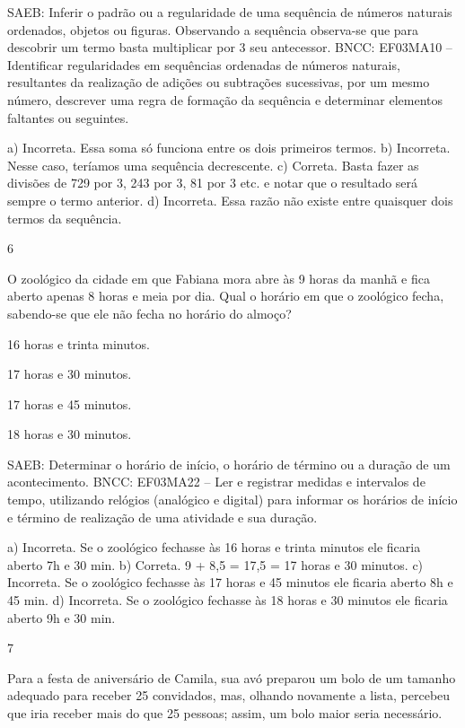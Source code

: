 \begin{multicols}{2}
\begin{enumerate}
{SAEB: Inferir o padrão ou a regularidade de uma sequência de números naturais ordenados, objetos ou figuras. Observando a sequência observa-se que para descobrir um termo basta multiplicar por 3 seu antecessor.
BNCC: EF03MA10 -- Identificar regularidades em sequências ordenadas de números naturais,
resultantes da realização de adições ou subtrações sucessivas, por um mesmo número,
descrever uma regra de formação da sequência e determinar elementos faltantes ou seguintes.

a) Incorreta. Essa soma só funciona entre os dois primeiros termos.
b) Incorreta. Nesse caso, teríamos uma sequência decrescente.
c) Correta. Basta fazer as divisões de 729 por 3, 243 por 3, 81 por 3 etc. e notar que o resultado será sempre o termo anterior.
d) Incorreta. Essa razão não existe entre quaisquer dois termos da sequência.

\num{6}

O zoológico da cidade em que Fabiana mora abre às 9 horas da manhã e fica aberto apenas 8 horas e meia por dia. Qual o horário em que o zoológico fecha, sabendo-se que ele não fecha no horário do almoço?

\begin{escolha}
\item
  16 horas e trinta minutos.
\item
  17 horas e 30 minutos.
\item
  17 horas e 45 minutos.
\item
  18 horas e 30 minutos.
\end{escolha}

SAEB: Determinar o horário de início, o horário de término ou a duração de um acontecimento.
BNCC: EF03MA22 -- Ler e registrar medidas e intervalos de tempo, utilizando relógios (analógico e
digital) para informar os horários de início e término de realização de uma atividade e sua duração.

a) Incorreta. Se o zoológico fechasse às 16 horas e trinta minutos ele ficaria aberto 7h e 30 min.
b) Correta. 9 + 8,5 = 17,5 = 17 horas e 30 minutos.
c) Incorreta. Se o zoológico fechasse às 17 horas e 45 minutos ele ficaria aberto 8h e 45 min.
d) Incorreta. Se o zoológico fechasse às 18 horas e 30 minutos ele ficaria aberto 9h e 30 min.

\num{7}

Para a festa de aniversário de Camila, sua avó preparou um bolo de um tamanho adequado para receber 25 convidados, mas, olhando novamente a lista, percebeu que iria receber mais do que 25 pessoas; assim, um bolo maior seria necessário.

}
\end{enumerate}
\end{multicols}

